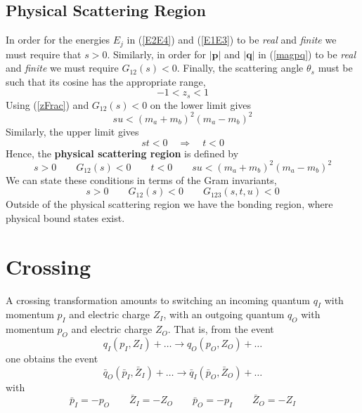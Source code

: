 \subsection{Physical Scattering Region\label{PhysScatReg}}
In order for the energies $E_{j}$ in (\ref{E2E4}) and (\ref{E1E3}) to be \textit{real} and \textit{finite} we must require that $s > 0$. Similarly, in order for $|\mathbf{p}|$ and $|\mathbf{q}|$ in (\ref{magpq}) to be \textit{real} and \textit{finite} we must require $G_{12}(s) < 0$. Finally, the scattering angle $\theta_{s}$ must be such that its cosine has the appropriate range,
\begin{equation}
	{-1} < z_{s} < 1
\end{equation}
Using (\ref{zFrac}) and $G_{12}(s) < 0$ on the lower limit gives
\begin{equation}
	s u < (m_{a} + m_{b})^{2} (m_{a} - m_{b})^{2}
\end{equation}
Similarly, the upper limit gives
\begin{equation}
	st < 0 \quad \Longrightarrow \quad t < 0
\end{equation}
Hence, the \textbf{physical scattering region} is defined by
\begin{equation}
	s > 0 \qquad G_{12}(s) < 0 \qquad t < 0 \qquad s u < (m_{a} + m_{b})^{2} (m_{a} - m_{b})^{2} \label{PSRs}
\end{equation}
We can state these conditions in terms of the Gram invariants,
\begin{equation}
	s > 0 \qquad G_{12}(s) < 0 \qquad G_{123}(s, t, u) < 0
\end{equation}
Outside of the physical scattering region we have the bonding region, where physical bound states exist.
\section{Crossing}
A crossing transformation amounts to switching an incoming quantum $q_{I}$ with momentum $p_{I}$ and electric charge $Z_{I}$, with an outgoing quantum $q_{O}$ with momentum $p_{O}$ and electric charge $Z_{O}$. That is, from the event
\begin{equation}
	q_{I}(p_{I}, Z_{I}) + \ldots \longrightarrow q_{O}(p_{O}, Z_{O}) + \ldots
\end{equation}
one obtains the event
\begin{equation}
	\bar{q}_{O}(\bar{p}_{I}, \bar{Z}_{I}) + \ldots \longrightarrow \bar{q}_{I}(\bar{p}_{O}, \bar{Z}_{O}) + \ldots
\end{equation}
with
\begin{equation}
	\bar{p}_{I} = -p_{O} \qquad \bar{Z}_{I} = -Z_{O} \qquad \bar{p}_{O} = -p_{I} \qquad \bar{Z}_{O} = -Z_{I}
\end{equation}

